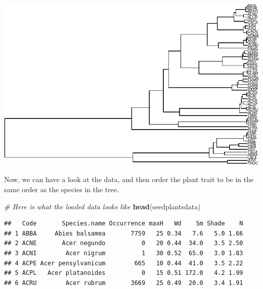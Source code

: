 \documentclass[
]{book}
\newenvironment{Shaded}{\begin{snugshade}}{\end{snugshade}}
\newcommand{\CommentTok}[1]{\textcolor[rgb]{0.56,0.35,0.01}{\textit{#1}}}
\newcommand{\FunctionTok}[1]{\textcolor[rgb]{0.13,0.29,0.53}{\textbf{#1}}}
\newcommand{\NormalTok}[1]{#1}
\newcommand{\OtherTok}[1]{\textcolor[rgb]{0.56,0.35,0.01}{#1}}
\newcommand{\SpecialCharTok}[1]{\textcolor[rgb]{0.81,0.36,0.00}{\textbf{#1}}}
\begin{document}
\begin{center}\includegraphics{pcm-workshop_files/figure-latex/Open_seed_plant_data-1} \end{center}

Now, we can have a look at the data, and then order the plant trait to be in the same order as the species in the tree.

\begin{Shaded}
\begin{Highlighting}[]
\CommentTok{\# Here is what the loaded data looks like}
\FunctionTok{head}\NormalTok{(seedplantsdata)}
\end{Highlighting}
\end{Shaded}

\begin{verbatim}
##   Code       Species.name Occurrence maxH   Wd    Sm Shade    N
## 1 ABBA     Abies balsamea       7759   25 0.34   7.6   5.0 1.66
## 2 ACNE       Acer negundo          0   20 0.44  34.0   3.5 2.50
## 3 ACNI        Acer nigrum          1   30 0.52  65.0   3.0 1.83
## 4 ACPE Acer pensylvanicum        665   10 0.44  41.0   3.5 2.22
## 5 ACPL   Acer platanoides          0   15 0.51 172.0   4.2 1.99
## 6 ACRU        Acer rubrum       3669   25 0.49  20.0   3.4 1.91
\end{verbatim}

\begin{Shaded}
\end{Shaded}
\end{document}
